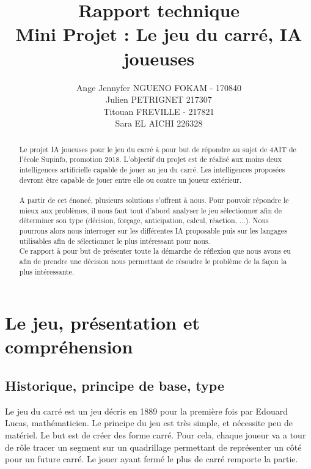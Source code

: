 \documentclass[a4paper,12pt]{report}
\title{Rapport technique \\Mini Projet : Le jeu du carré, IA joueuses}
\author{Ange Jennyfer NGUENO FOKAM - 170840\\Julien PETRIGNET 217307\\Titouan FREVILLE - 217821\\Sara EL AICHI 226328}
\begin{document}
\maketitle
\tableofcontents
\listoffigures

\begin{abstract}
Le projet IA joueuses pour le jeu du carré à pour but de répondre au sujet de 4AIT de l'école Supinfo, promotion 2018. L'objectif du projet est de réalisé aux moins deux intelligences artificielle capable de jouer au jeu du carré. Les intelligences propos\'ees devront \^etre capable de jouer entre elle ou contre un joueur ext\'erieur. \\
\\
A partir de cet \'enonc\'e, plusieurs solutions s'offrent \`a nous. Pour pouvoir r\'epondre le mieux aux probl\`emes, il nous faut tout d'abord analyser le jeu s\'electionner afin de d\'eterminer son type (d\'ecision, for\c{c}age, anticipation, calcul, r\'eaction, ...). Nous pourrons alors nous interroger sur les diff\'erentes IA proposable puis sur les langages utilisables afin de s\'electionner le plus intéressant pour nous.
\\
Ce rapport \`a pour but de pr\'esenter toute la d\'emarche de r\'eflexion que nous avons eu afin de prendre une d\'ecision nous permettant de r\'esoudre le probl\`eme de la fa\c{c}on la plus intéressante.
\end{abstract}

\part{Le jeu, pr\'esentation et compr\'ehension}

\chapter{Historique, principe de base, type}
Le jeu du carr\'e est un jeu d\'ecris en 1889 pour la premi\`ere fois par Edouard Lucas, math\'ematicien. Le principe du jeu est tr\`es simple, et nécessite peu de mat\'eriel. Le but est de cr\'eer des forme carr\'e. Pour cela, chaque joueur va a tour de r\^ole tracer un segment sur un quadrillage permettant de repr\'esenter un c\^ot\'e pour un future carr\'e. Le jouer ayant ferm\'e le plus de carr\'e remporte la partie.
\end{document}

